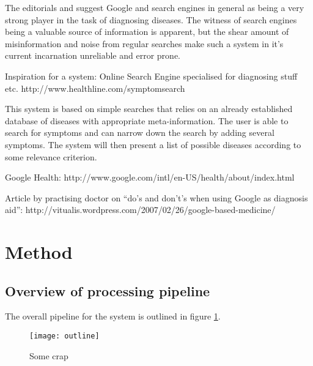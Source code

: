 \documentclass[10pt,letterpaper,draft]{article}
\begin{document}
The editorials \cite{googlechangemedicine} and
\cite{diagnosissearchengines} suggest Google and search engines in
general as being a very strong player in the task of diagnosing
diseases. The witness of search engines being a valuable source of
information is apparent, but the shear amount of misinformation and
noise from regular searches make such a system in it’s current
incarnation unreliable and error prone.


Inspiration for a system: Online Search Engine specialised for
diagnosing stuff etc.
http://www.healthline.com/symptomsearch

This system is based on simple searches that relies on an already
established database of diseases with appropriate meta-information. The
user is able to search for symptoms and can narrow down the search by
adding several symptoms. The system will then present a list of possible
diseases according to some relevance criterion.



Google Health: http://www.google.com/intl/en-US/health/about/index.html


Article by practising doctor on “do’s and don’t’s when using Google as
diagnosis aid”:
http://vitualis.wordpress.com/2007/02/26/google-based-medicine/


\section{Method}

\subsection{Overview of processing pipeline}
The overall pipeline for the system is outlined in figure
\ref{fig:outline}.

\begin{figure}[htp!]
\begin{center}
\texttt{[image: outline]}
\caption{Some crap}
\label{fig:outline}
\end{center}
\end{figure}
\end{document}
